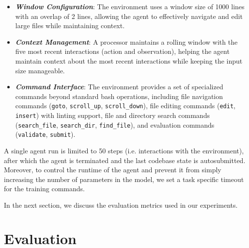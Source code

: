 \documentclass[]{fairmeta}
\newcommand{\ibold}[1]{\textbf{\textit{#1}}}
\newcommand{\dn}[1]{\colorbox{magenta}{\textcolor{white}{Deepak}}\textcolor{magenta}{\textbf{:#1}}}
\newcommand{\nr}[1]{\colorbox{Emerald}{\textcolor{white}{Nick}}\textcolor{Emerald}{\textbf{:#1}}}
\begin{document}
\begin{itemize}
    \item \ibold{Window Configuration}: The environment uses a window size of 1000 lines with an overlap of 2 lines, allowing the agent to effectively navigate and edit large files while maintaining context.

    \item \ibold{Context Management}: A processor maintains a rolling window with the five most recent interactions (action and observation), helping the agent maintain context about the most recent interactions while keeping the input size manageable.

    \item \ibold{Command Interface}: The environment provides a set of specialized commands beyond standard bash operations, including file navigation commands (\texttt{goto}, \texttt{scroll\_up}, \texttt{scroll\_down}), file editing commands (\texttt{edit}, \texttt{insert}) with linting support,  file and directory search commands (\texttt{search\_file}, \texttt{search\_dir}, \texttt{find\_file}), and evaluation commands (\texttt{validate}, \texttt{submit}).
\end{itemize}

A single agent run is limited to 50 steps (i.e. interactions with the environment), after which the agent is terminated and the last codebase state is autosubmitted.
%
Moreover, to control the runtime of the agent and prevent it from simply increasing the number of parameters in the model, we set a task specific timeout for the training commands.

In the next section, we discuss the evaluation metrics used in our experiments.

\section{Evaluation}
\label{sec:evaluation}

\end{document}

